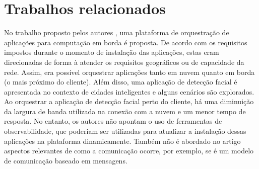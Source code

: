 




\section{Trabalhos relacionados}

 No trabalho proposto pelos autores , uma plataforma de orquestração de aplicações para computação em borda é proposta. De acordo com os requisitos impostos durante o momento de instalação das aplicações, estas eram direcionadas de forma à atender os requisitos geográficos ou de capacidade da rede. Assim, era possível orquestrar aplicações tanto em nuvem quanto em borda (o mais próximo do cliente). Além disso, uma aplicação de detecção facial é apresentada no contexto de cidades inteligentes e alguns cenários são explorados. Ao orquestrar a aplicação de detecção facial perto do cliente, há uma diminuição da largura de banda utilizada na conexão com a nuvem e um menor tempo de resposta. No entanto, os autores não apontam o uso de ferramentas de observabilidade, que poderiam ser utilizadas para atualizar a instalação dessas aplicações na plataforma dinamicamente. Também não é abordado no artigo aspectos relevantes de como a comunicação ocorre, por exemplo, se é um modelo de comunicação baseado em mensagens.

